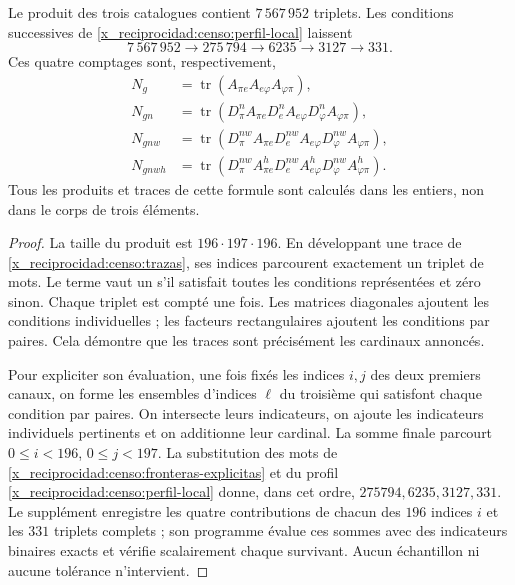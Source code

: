 \begin{theorem}
\label{x_reciprocidad:censo:teorema-conteo}
Le produit des trois catalogues contient \(7\,567\,952\) triplets.
Les conditions successives de \eqref{x_reciprocidad:censo:perfil-local} laissent
\begin{equation}
 7\,567\,952\longrightarrow275\,794\longrightarrow6235
 \longrightarrow3127\longrightarrow331.
 \label{x_reciprocidad:censo:cadena-local}
\end{equation}
Ces quatre comptages sont, respectivement,
\begin{align}
 N_g&=\operatorname{tr}(A_{\pi e}A_{e\varphi}A_{\varphi\pi}),
 \nonumber\\
 N_{gn}&=\operatorname{tr}(D_\pi^n A_{\pi e}
             D_e^n A_{e\varphi}D_\varphi^n A_{\varphi\pi}),
 \nonumber\\
 N_{gnw}&=\operatorname{tr}(D_\pi^{nw} A_{\pi e}
             D_e^{nw} A_{e\varphi}D_\varphi^{nw} A_{\varphi\pi}),
 \nonumber\\
 N_{gnwh}&=\operatorname{tr}(D_\pi^{nw} A^h_{\pi e}
             D_e^{nw} A^h_{e\varphi}D_\varphi^{nw} A^h_{\varphi\pi}).
 \label{x_reciprocidad:censo:trazas}
\end{align}
Tous les produits et traces de cette formule sont calculés dans les entiers,  
non dans le corps de trois éléments.
\end{theorem}
\begin{proof}
La taille du produit est \(196\cdot197\cdot196\). En développant
une trace de \eqref{x_reciprocidad:censo:trazas}, ses indices parcourent exactement un
triplet de mots. Le terme vaut un s'il satisfait toutes les conditions
représentées et zéro sinon. Chaque triplet est compté une fois.
Les matrices diagonales ajoutent les conditions individuelles ; les facteurs
rectangulaires ajoutent les conditions par paires. Cela démontre que les
traces sont précisément les cardinaux annoncés.

Pour expliciter son évaluation, une fois fixés les indices \(i,j\) des deux premiers canaux, on forme les ensembles d'indices \(\ell\) du troisième qui satisfont chaque condition par paires. On intersecte leurs indicateurs, on ajoute les indicateurs individuels pertinents et on additionne leur cardinal. La somme finale parcourt \(0\leq i<196\), \(0\leq j<197\). La substitution des mots de \eqref{x_reciprocidad:censo:fronteras-explicitas} et du profil \eqref{x_reciprocidad:censo:perfil-local} donne, dans cet ordre, \(275794,6235,3127,331\). Le supplément enregistre les quatre contributions de chacun des \(196\) indices \(i\) et les \(331\) triplets complets ; son programme évalue ces sommes avec des indicateurs binaires exacts et vérifie scalairement chaque survivant. Aucun échantillon ni aucune tolérance n'intervient.
\end{proof}

